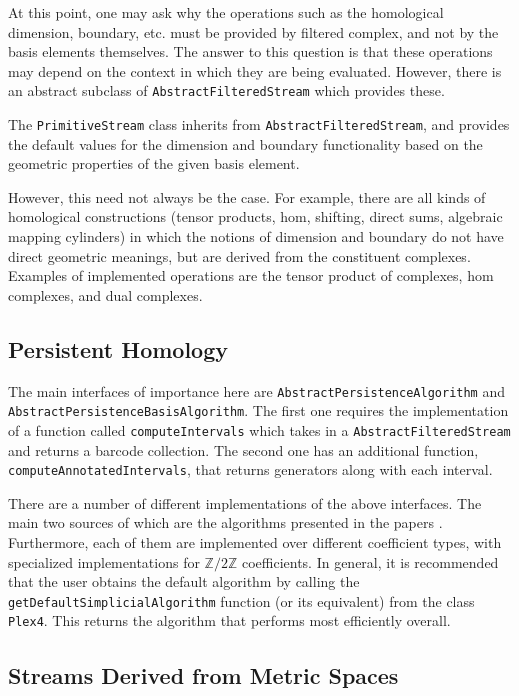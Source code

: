 At this point, one may ask why the operations such as the homological dimension, boundary, etc. must be provided by filtered complex, and not by the basis elements themselves. The answer to this question is that these operations may depend on the context in which they are being evaluated. However, there is an abstract subclass of {\tt AbstractFilteredStream} which provides these.

The {\tt PrimitiveStream} class inherits from {\tt AbstractFilteredStream}, and provides the default values for the dimension and boundary functionality based on the geometric properties of the given basis element.

However, this need not always be the case. For example, there are all kinds of homological constructions (tensor products, hom, shifting, direct sums, algebraic mapping cylinders) in which the notions of dimension and boundary do not have direct geometric meanings, but are derived from the constituent complexes. Examples of implemented operations are the tensor product of complexes, hom complexes, and dual complexes.

\subsection{Persistent Homology}

The main interfaces of importance here are {\tt AbstractPersistenceAlgorithm} and {\tt Abstract\-Persistence\-Basis\-Algorithm}. The first one requires the implementation of a function called {\tt computeIntervals} which takes in a {\tt AbstractFilteredStream} and returns a barcode collection. The second one has an additional function, {\tt computeAnnotatedIntervals}, that returns generators along with each interval.

There are a number of different implementations of the above interfaces. The main two sources of which are the algorithms presented in the papers \cite{Carlsson_04, Dualities}. Furthermore, each of them are implemented over different coefficient types, with specialized implementations for $\mathbb{Z}/2\mathbb{Z}$ coefficients. In general, it is recommended that the user obtains the default algorithm by calling the {\tt getDefaultSimplicialAlgorithm} function (or its equivalent) from the class {\tt Plex4}. This returns the algorithm that performs most efficiently overall.

\subsection{Streams Derived from Metric Spaces}

